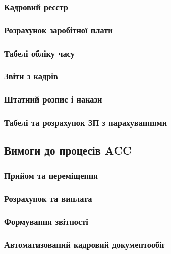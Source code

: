 \subsubsection{Кадровий реєстр}

\subsubsection{Розрахунок заробітної плати}

\subsubsection{Табелі обліку часу}

\subsubsection{Звіти з кадрів}

\subsubsection{Штатний розпис і накази}

\subsubsection{Табелі та розрахунок ЗП з нарахуваннями}

\subsection{Вимоги до процесів ACC}

\subsubsection{Прийом та переміщення}

\subsubsection{Розрахунок та виплата}

\subsubsection{Формування звітності}

\subsubsection{Автоматизований кадровий документообіг}

